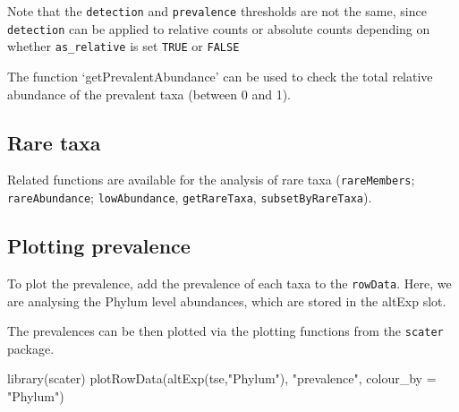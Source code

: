 \documentclass[
]{book}
\newenvironment{Shaded}{\begin{snugshade}}{\end{snugshade}}
\newcommand{\AttributeTok}[1]{\textcolor[rgb]{0.77,0.63,0.00}{#1}}
\newcommand{\ConstantTok}[1]{\textcolor[rgb]{0.00,0.00,0.00}{#1}}
\newcommand{\DecValTok}[1]{\textcolor[rgb]{0.00,0.00,0.81}{#1}}
\newcommand{\FunctionTok}[1]{\textcolor[rgb]{0.00,0.00,0.00}{#1}}
\newcommand{\NormalTok}[1]{#1}
\newcommand{\OtherTok}[1]{\textcolor[rgb]{0.56,0.35,0.01}{#1}}
\newcommand{\SpecialCharTok}[1]{\textcolor[rgb]{0.00,0.00,0.00}{#1}}
\newcommand{\StringTok}[1]{\textcolor[rgb]{0.31,0.60,0.02}{#1}}
\begin{document}
Note that the \texttt{detection} and \texttt{prevalence} thresholds are not the same, since
\texttt{detection} can be applied to relative counts or absolute counts depending on
whether \texttt{as\_relative} is set \texttt{TRUE} or \texttt{FALSE}

The function `getPrevalentAbundance' can be used to check the total
relative abundance of the prevalent taxa (between 0 and 1).

\hypertarget{rare-taxa}{%
\subsection{Rare taxa}\label{rare-taxa}}

Related functions are available for the analysis of rare taxa
(\texttt{rareMembers}; \texttt{rareAbundance}; \texttt{lowAbundance}, \texttt{getRareTaxa},
\texttt{subsetByRareTaxa}).

\hypertarget{plotting-prevalence}{%
\subsection{Plotting prevalence}\label{plotting-prevalence}}

To plot the prevalence, add the prevalence of each taxa to the
\texttt{rowData}. Here, we are analysing the Phylum level abundances, which
are stored in the altExp slot.

\begin{Shaded}
\end{Shaded}

The prevalences can be then plotted via the plotting functions from
the \texttt{scater} package.

\begin{Shaded}
\begin{Highlighting}[]
\FunctionTok{library}\NormalTok{(scater)}
\FunctionTok{plotRowData}\NormalTok{(}\FunctionTok{altExp}\NormalTok{(tse,}\StringTok{"Phylum"}\NormalTok{), }\StringTok{"prevalence"}\NormalTok{, }\AttributeTok{colour\_by =} \StringTok{"Phylum"}\NormalTok{)}
\end{Highlighting}
\end{Shaded}
\end{document}
